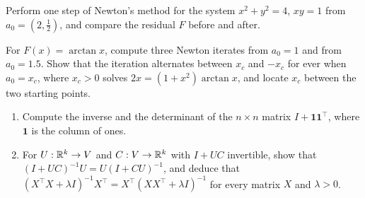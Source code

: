 \begin{notechapter}
\begin{exercise}\label{contractions-newton:exr:8}
Perform one step of Newton's method for the system
$x^2 + y^2 = 4$, $xy = 1$ from $a_0 = (2, \frac12)$, and compare the
residual $F$ before and after.
\end{exercise}

\begin{exercise}\label{contractions-newton:exr:9}
For $F(x) = \arctan x$, compute three Newton iterates from $a_0 = 1$ and
from $a_0 = 1.5$. Show that the iteration alternates between $x_c$ and
$-x_c$ for ever when $a_0 = x_c$, where $x_c > 0$ solves
$2x = (1 + x^2)\arctan x$, and locate $x_c$ between the two starting
points.
\end{exercise}

\begin{exercise}\label{contractions-newton:exr:10}
\begin{enumerate}[nosep]
  \item Compute the inverse and the determinant of the $n\times n$
        matrix $I + \mathbf 1\mathbf 1^\top$, where $\mathbf 1$ is the
        column of ones.
  \item For $U:\mathbb{R}^k\to V$ and $C:V\to\mathbb{R}^k$ with $I + UC$
        invertible, show that $(I + UC)^{-1}U = U(I + CU)^{-1}$, and
        deduce that
        $(X^\top X + \lambda I)^{-1}X^\top
        = X^\top(XX^\top + \lambda I)^{-1}$ for every matrix $X$ and
        $\lambda > 0$.
\end{enumerate}
\end{exercise}
\end{notechapter}

